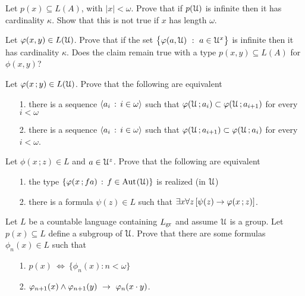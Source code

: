 \begin{exercise}\label{cadinalitafinitasaturazione}
Let $p(x)\subseteq L(A)$, with $|x|<\omega$. 
Prove that if $p(\EuScript U)$ is infinite then it has cardinality $\kappa$. 
Show that this is not true if $x$ has length $\omega$. 
\end{exercise}

\begin{exercise}\label{cadinalitafinitasaturazioneinsiemi}
Let $\varphi(x,y)\in L(\EuScript U)$. Prove that if the set $\big\{\varphi(a,\EuScript U)\ :\ a\in\EuScript U^{x}\big\}$ is infinite then it has cardinality $\kappa$.
Does the claim remain true with a type $p(x,y)\subseteq L(A)$ for $\phi(x,y)$? 
\end{exercise}

\begin{exercise}\label{ex_saturazione_catene_insiemi}
Let $\varphi(x\,;y)\in L(\EuScript U)$. Prove that the following are equivalent
\begin{itemize}
\item[1.] there is a sequence $\langle a_i\,:\,i\in\omega\rangle$ such that $\varphi(\EuScript U\,;a_i)\subset\varphi(\EuScript U\,;a_{i+1})$ for every $i<\omega$
\item[2.] there is a sequence $\langle a_i\,:\,i\in\omega\rangle$ such that $\varphi(\EuScript U\,;a_{i+1})\subset\varphi(\EuScript U\,;a_i)$ for every $i<\omega$.
\end{itemize}
\end{exercise}

\begin{exercise}\label{ex_ak_definibilita}
  Let $\phi(x\,;z)\in L$ and $a\in\EuScript U^z$.
  Prove that the following are equivalent
  \begin{itemize}
    \item[1.] the type $\{\varphi(x\,;fa)\,:\,f\in{\rm Aut\kern.15ex}(\EuScript U)\}$ is realized (in $\EuScript U$)
    \item[2.] there is a formula $\psi(z)\in L$ such that $\exists x\forall z\,[\psi(z)\rightarrow\varphi(x\,;z)]$.
  \end{itemize}  
\end{exercise}

\begin{exercise}\label{ex_typedef_groups}
  Let $L$ be a countable language containing $L_{\rm gr}$ and assume $\EuScript U$ is a group.
  Let $p(x)\subseteq L$ define a subgroup of $\EuScript U$.
  Prove that there are some formulas $\phi_n(x)\in L$ such that 
  \begin{itemize}
    \item[1.] $p(x)\ \iff\ \{\phi_n(x):n<\omega\}$
    \item[2.] $\phi_{n+1}(x)\wedge\phi_{n+1}(y)\ \imp\ \phi_n(x\cdot y)$.
  \end{itemize}
\end{exercise}

